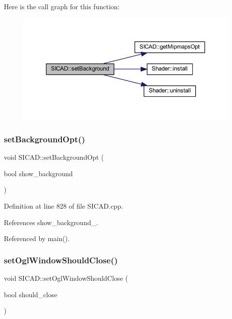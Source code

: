 Here is the call graph for this function\+:
\nopagebreak
\begin{figure}[H]
\begin{center}
\leavevmode
\includegraphics[width=350pt]{classSICAD_a25b180f54f2e93d69b291cc225600c8e_cgraph}
\end{center}
\end{figure}
\mbox{\label{classSICAD_a07921943ad3d4016dcbe76135e799754}} 
\subsubsection{\texorpdfstring{set\+Background\+Opt()}{setBackgroundOpt()}}
{\footnotesize\ttfamily void S\+I\+C\+A\+D\+::set\+Background\+Opt (\begin{DoxyParamCaption}\item[{bool}]{show\+\_\+background }\end{DoxyParamCaption})}



Definition at line 828 of file S\+I\+C\+A\+D.\+cpp.



References show\+\_\+background\+\_\+.



Referenced by main().

\mbox{\label{classSICAD_a0e42acab32252ddc878794f365ee1037}} 
\subsubsection{\texorpdfstring{set\+Ogl\+Window\+Should\+Close()}{setOglWindowShouldClose()}}
{\footnotesize\ttfamily void S\+I\+C\+A\+D\+::set\+Ogl\+Window\+Should\+Close (\begin{DoxyParamCaption}\item[{bool}]{should\+\_\+close }\end{DoxyParamCaption})}




